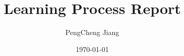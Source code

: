 \documentclass[a4paper]{amsart}
\begin{document}
%
%
\title[Learning Process]{Learning Process Report}%

\author{PengCheng Jiang}
\address[A.~1]{School of Computer Science,\\ 
JiLin University, jilin 130000, China}%

%
\date{\today}%




\maketitle
\newpage

\tableofcontents

\newpage



\newpage



\listoftodos
\end{document}
